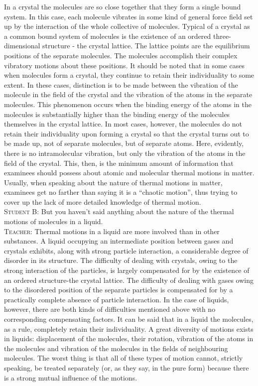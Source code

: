 \documentclass[a4paper,sfsidenotes]{tufte-book}
\begin{document}
In a crystal the molecules are so close together that they form a single bound system. In this case, each molecule vibrates in some kind of general force field set up by the interaction of the whole collective of molecules. Typical of a crystal as a common bound system of molecules is the existence of an ordered three-dimensional structure - the crystal lattice. The lattice points are the equilibrium positions of the separate molecules. The molecules accomplish their complex vibratory motions about these positions. It should be noted that in some cases when molecules form a crystal, they continue to retain their individuality to some extent. In these cases, distinction is to be made between the vibration of the molecule in the field of the crystal and the vibration of the atoms in the separate molecules. This phenomenon occurs when the binding energy of the atoms in the molecules is substantially higher than the binding energy of the molecules themselves in the crystal lattice. In most cases, however, the molecules do not retain their individuality upon forming a crystal so that the crystal turns out to be made up, not of separate molecules, but of separate atoms. Here, evidently, there is no intramolecular vibration, but only the vibration of the atoms in the field of the crystal. This, then, is the minimum amount of information that examinees should possess about atomic and molecular thermal motions in matter. Usually, when speaking about the nature of thermal motions in matter, examinees get no farther than saying it is a ``chaotic motion'', thus trying to cover up the lack of more detailed knowledge of thermal motion.
\\
\textsc{Student B:} But you haven't said anything about the nature of the thermal motions of molecules in a liquid.
\\
\textsc{Teacher:} Thermal motions in a liquid are more involved than in other substances. A liquid occupying an intermediate position between gases and crystals exhibits, along with strong particle interaction, a considerable degree of disorder in its structure. The difficulty of dealing with crystals, owing to the strong interaction of the particles, is largely compensated for by the existence of an ordered structure-the crystal lattice. The difficulty of dealing with gases owing to the disordered position of the separate particles is compensated for by a practically complete absence of particle interaction. In the case of liquids, however, there are both kinds of difficulties mentioned above with no corresponding compensating factors. It can be said that in a liquid the molecules, as a rule, completely retain their individuality. A great diversity of motions exists in liquids: displacement of the molecules, their rotation, vibration of the atoms in the molecules and vibration of the molecules in the fields of neighbouring molecules. The worst thing is that all of these types of motion cannot, strictly speaking, be treated separately (or, as they say, in the pure form) because there is a strong mutual influence of the motions.
\end{document}
